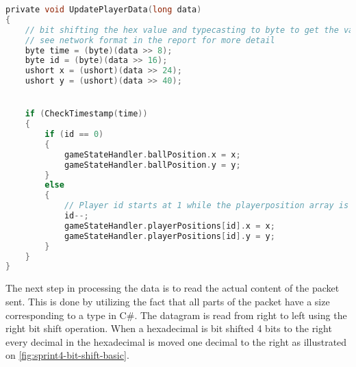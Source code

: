 \begin{lstlisting}[caption={Updating player data in UDP client}, captionpos=b,language=C,label={lst:updateplayerdata}]
private void UpdatePlayerData(long data)
{
    // bit shifting the hex value and typecasting to byte to get the values.
    // see network format in the report for more detail
    byte time = (byte)(data >> 8);
    byte id = (byte)(data >> 16);
    ushort x = (ushort)(data >> 24);
    ushort y = (ushort)(data >> 40);


    if (CheckTimestamp(time))
    {
        if (id == 0)
        {
            gameStateHandler.ballPosition.x = x;
            gameStateHandler.ballPosition.y = y;
        }
        else
        {
            // Player id starts at 1 while the playerposition array is 0 indexed. Decrementing id so that they line up.
            id--;
            gameStateHandler.playerPositions[id].x = x;
            gameStateHandler.playerPositions[id].y = y;
        }
    }
}
\end{lstlisting}
\noindent
The next step in processing the data is to read the actual content of the packet sent.
This is done by utilizing the fact that all parts of the packet have a size corresponding to a type in C\#.
The datagram is read from right to left using the right bit shift operation.
When a hexadecimal is bit shifted 4 bits to the right every decimal in the hexadecimal is moved one decimal to the right as illustrated on \autoref{fig:sprint4-bit-shift-basic}.

